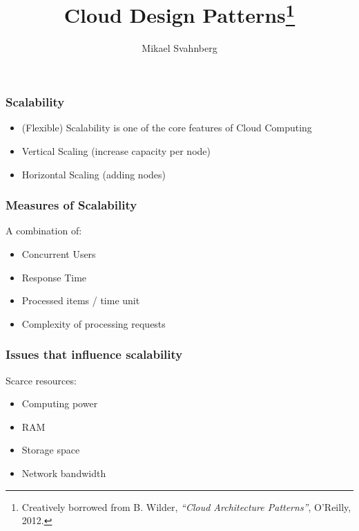 \documentclass[10pt]{beamer}
\title[]{Cloud Design Patterns\footnote{Creatively borrowed from B. Wilder, \emph{``Cloud Architecture Patterns''}, O'Reilly, 2012.}}
\subtitle{}
\author[Mikael Svahnberg]{Mikael Svahnberg\inst{1}}
\institute[BTH] %
{
  \inst{1}%
 Mikael.Svahnberg@bth.se\\
 School of Computing\\
 Blekinge Institute of Technology%
}
\begin{document}
\begin{frame}
  \titlepage
\end{frame}


\begin{frame}[t]
\frametitle{Scalability}

\begin{itemize}
\item (Flexible) Scalability is one of the core features of Cloud Computing
\item Vertical Scaling (increase capacity per node)
\item Horizontal Scaling (adding nodes)
\end{itemize}
\end{frame}


\begin{frame}[t]
\frametitle{Measures of Scalability}
A combination of:
\begin{itemize}
\item Concurrent Users
\item Response Time
\item Processed items / time unit
\item Complexity of processing requests
\end{itemize}
\end{frame}

\begin{frame}[t]
\frametitle{Issues that influence scalability}
Scarce resources:
\begin{itemize}
\item Computing power
\item RAM
\item Storage space
\item Network bandwidth
\end{itemize}
\end{frame}
\end{document}

